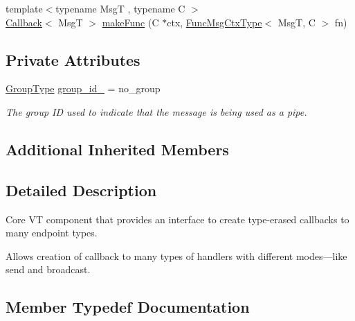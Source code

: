 \begin{DoxyCompactItemize}
\item 
{\footnotesize template$<$typename MsgT , typename C $>$ }\\\hyperlink{namespacevt_a36db99df4c973d48b1118a293fff533f}{Callback}$<$ MsgT $>$ \hyperlink{structvt_1_1pipe_1_1_pipe_manager_a92427d0fbe9ee05aff71178147814c96}{make\+Func} (C $\ast$ctx, \hyperlink{structvt_1_1pipe_1_1_pipe_manager_base_a73fdf82ece0411b3dc644c99b763f7a9}{Func\+Msg\+Ctx\+Type}$<$ MsgT, C $>$ fn)
\end{DoxyCompactItemize}
\subsection*{Private Attributes}
\begin{DoxyCompactItemize}
\item 
\hyperlink{namespacevt_a27b5e4411c9b6140c49100e050e2f743}{Group\+Type} \hyperlink{structvt_1_1pipe_1_1_pipe_manager_a55c4e1e68f74a2a0796a24ea06711563}{group\+\_\+id\+\_\+} = no\+\_\+group
\begin{DoxyCompactList}\small\item\em The group ID used to indicate that the message is being used as a pipe. \end{DoxyCompactList}\end{DoxyCompactItemize}
\subsection*{Additional Inherited Members}


\subsection{Detailed Description}
Core VT component that provides an interface to create type-\/erased callbacks to many endpoint types. 

Allows creation of callback to many types of handlers with different modes---like send and broadcast. 

\subsection{Member Typedef Documentation}
\mbox{\label{structvt_1_1pipe_1_1_pipe_manager_a221ce8bc0fc6639f43dad1e53a08c0d2}} 
